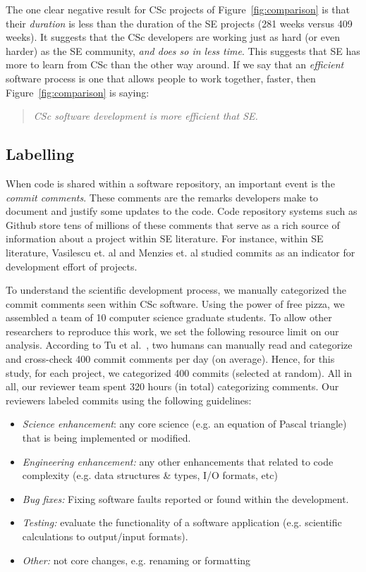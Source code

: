 \documentclass[conference,10pt]{IEEEtran}
\newcommand{\bi}{\begin{itemize}}
\newcommand{\ei}{\end{itemize}}
\begin{document}
The one clear negative result for CSc projects of Figure~\ref{fig:comparison} is that their {\em duration} is less than the duration of the SE projects (281 weeks versus 409 weeks). 
It suggests
that the CSc developers are working
just as hard (or even harder)
as the SE community, {\em and does so in less time}.
This suggests that SE has more to learn from CSc than the other way around.
If we say that   an {\em efficient} software process is one that allows  people to work together, faster,  then 
Figure~\ref{fig:comparison} is saying:
\begin{quote}
{\em CSc software development is  more efficient that SE.}
\end{quote} 

     
 \subsection{Labelling}\label{tion:labelling}
 When code is shared
within a software repository, an important event is the {\em commit comments}. These comments are the remarks developers make to document and justify some updates to the code. Code repository systems such as Github store tens of millions of these comments that serve as a rich source of information about a project within SE literature. For instance, within SE literature,  Vasilescu et. al \cite{vasilescu16_limit} and Menzies et. al \cite{xia2019sequential} studied commits as an indicator for development effort of projects.


To understand the scientific development process, we manually categorized the commit comments seen within CSc
software. 
Using the power of free pizza, we assembled a team of 10 computer science 
graduate students.
To allow other researchers to reproduce this work, we set
the following
resource limit on our analysis.
According to Tu et al.~\cite{tu2019better}, two humans can manually read and categorize
and cross-check 400 commit comments per day (on average).
Hence, for this study, for each project, we categorized 400 commits
(selected at random). 
All in all, our
reviewer team spent 320 hours (in total) categorizing comments. Our  reviewers
labeled commits using the following
guidelines:
\bi
\item {\em Science enhancement}: any core science (e.g. an equation of Pascal triangle) that is being implemented or modified.
\item {\em Engineering enhancement:} any other enhancements that related to code complexity (e.g. data structures \& types, I/O formats, etc) 
\item {\em Bug fixes:} Fixing software faults reported or found within the development. 
\item {\em Testing: } evaluate the functionality of a software application (e.g. scientific calculations to output/input formats).
\item
{\em Other:} not core changes, e.g. renaming or formatting 
\ei
\end{document}

